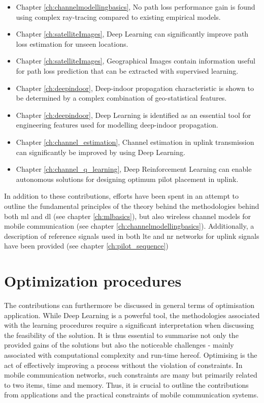 \begin{itemize}
    \item Chapter \ref{ch:channelmodellingbasics}, No path loss performance gain is found using complex ray-tracing compared to existing empirical models.
    \item Chapter \ref{ch:satelliteImages}, Deep Learning can significantly improve path loss estimation for unseen locations.
    \item Chapter \ref{ch:satelliteImages}, Geographical Images contain information useful for path loss prediction that can be extracted with supervised learning.
    \item Chapter \ref{ch:deepindoor}, Deep-indoor propagation characteristic is shown to be determined by a complex combination of geo-statistical features.
    \item Chapter \ref{ch:deepindoor}, Deep Learning is identified as an essential tool for engineering features used for modelling deep-indoor propagation.
    \item Chapter \ref{ch:channel_estimation}, Channel estimation in uplink transmission can significantly be improved by using Deep Learning.
    \item Chapter \ref{ch:channel_q_learning}, Deep Reinforcement Learning can enable autonomous solutions for designing optimum pilot placement in uplink.
\end{itemize}

In addition to these contributions, efforts have been spent in an attempt to outline the fundamental principles of the theory behind the methodologies behind both \acrfull{ml} and \acrfull{dl} (see chapter \ref{ch:mlbasics}), but also wireless channel models for mobile communication (see chapter \ref{ch:channelmodellingbasics}). Additionally, a description of reference signals used in both \gls{lte} and \gls{nr} networks for uplink signals have been provided (see chapter \ref{ch:pilot_sequence})


\section{Optimization procedures}
The contributions can furthermore be discussed in general terms of optimisation application. While Deep Learning is a powerful tool, the methodologies associated with the learning procedures require a significant interpretation when discussing the feasibility of the solution. It is thus essential to summarise not only the provided gains of the solutions but also the noticeable challenges - mainly associated with computational complexity and run-time hereof. Optimising is the act of effectively improving a process without the violation of constraints. In mobile communication networks, such constraints are many but primarily related to two items, time and memory. Thus, it is crucial to outline the contributions from applications and the practical constraints of mobile communication systems.

